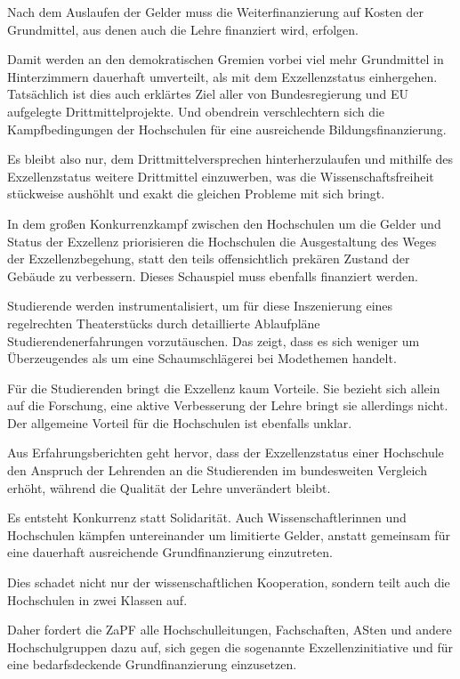\documentclass[DIV=calc]{scrartcl}
\let\oldgrqq=\grqq
\def\grqq{\oldgrqq\xspace}
\begin{document}
Nach dem Auslaufen der Gelder muss die Weiterfinanzierung auf Kosten der Grundmittel, aus denen auch die Lehre finanziert wird, erfolgen.

Damit werden an den demokratischen Gremien vorbei viel mehr Grundmittel in Hinterzimmern dauerhaft umverteilt, als mit dem \glqq Exzellenz\grqq{}status einhergehen. Tatsächlich ist dies auch erklärtes Ziel aller von Bundesregierung und EU aufgelegte Drittmittelprojekte. Und obendrein verschlechtern sich die Kampfbedingungen der Hochschulen für eine ausreichende Bildungsfinanzierung.

Es bleibt also nur, dem Drittmittelversprechen hinterherzulaufen und mithilfe des
\glqq Exzellenz\grqq{}status weitere Drittmittel einzuwerben, was die Wissenschaftsfreiheit stückweise aushöhlt und exakt die gleichen Probleme mit sich bringt.

In dem großen Konkurrenzkampf zwischen den Hochschulen um die Gelder und Status der \glqq Exzellenz\grqq priorisieren die Hochschulen die Ausgestaltung des Weges der \glqq Exzellenz\grqq{}begehung, statt den teils offensichtlich prekären Zustand der Gebäude zu verbessern. Dieses Schauspiel muss ebenfalls finanziert werden.

Studierende werden instrumentalisiert, um für diese Inszenierung eines regelrechten Theaterstücks durch detaillierte Ablaufpläne Studierendenerfahrungen vorzutäuschen. Das zeigt, dass es sich weniger um Überzeugendes als um eine Schaumschlägerei bei Modethemen handelt.

Für die Studierenden bringt die \glqq Exzellenz\grqq kaum Vorteile. Sie bezieht sich allein auf die Forschung, eine aktive Verbesserung der Lehre bringt sie allerdings nicht. Der allgemeine Vorteil für die Hochschulen ist ebenfalls unklar.

Aus Erfahrungsberichten geht hervor, dass der \glqq Exzellenz\grqq{}status einer Hochschule den Anspruch der Lehrenden an die Studierenden im bundesweiten Vergleich erhöht, während die Qualität der Lehre unverändert bleibt.

Es entsteht Konkurrenz statt Solidarität. Auch Wissenschaftler\*innen und Hochschulen kämpfen untereinander um limitierte Gelder, anstatt gemeinsam für eine dauerhaft ausreichende Grundfinanzierung einzutreten.

Dies schadet nicht nur der wissenschaftlichen Kooperation, sondern teilt auch die Hochschulen in zwei Klassen auf.

Daher fordert die ZaPF alle Hochschulleitungen, Fachschaften, ASten und andere Hochschulgruppen dazu auf, sich gegen die sogenannte \glqq Exzellenz\grqq{}initiative und für eine bedarfsdeckende Grundfinanzierung einzusetzen.\\
\end{document}
